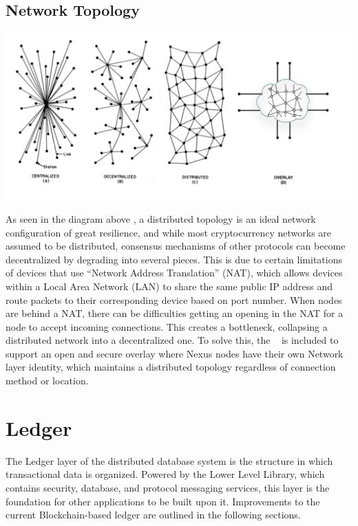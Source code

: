 \documentclass[11pt]{article}
\begin{document}
\subsection{Network Topology}

\includegraphics[width=1\textwidth]{./images/rsz_topology.png}

\noindent As seen in the diagram above \cite{Network_Topology}, a distributed topology is an ideal network configuration of great resilience, and while most cryptocurrency networks are assumed to be distributed, consensus mechanisms of other protocols can become decentralized by degrading into several pieces.
This is due to certain limitations of devices that use ``Network Address Translation'' (NAT), which allows devices within a Local Area Network (LAN) to share the same public IP address and route packets to their corresponding device based on port number.
When nodes are behind a NAT, there can be difficulties getting an opening in the NAT for a node to accept incoming connections.
This creates a bottleneck, collapsing a distributed network into a decentralized one.
To solve this, the ~
is included to support an open and secure overlay where Nexus nodes have their own Network layer identity, which maintains a distributed topology regardless of connection method or location.

\newpage
\section{Ledger}

The Ledger layer of the distributed database system is the structure in which transactional data is organized.
Powered by the Lower Level Library, which contains security, database, and protocol messaging services, this layer is the foundation for other applications to be built upon it.
Improvements to the current Blockchain-based ledger are outlined in the following sections.
\end{document}
